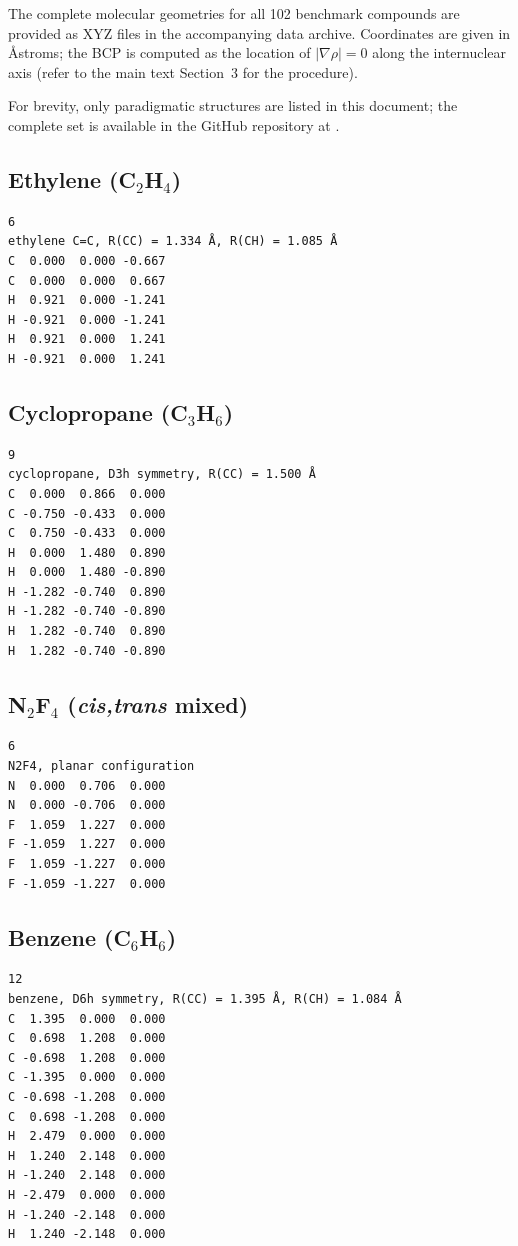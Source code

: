 \documentclass[11pt,a4paper]{article}
\begin{document}
The complete molecular geometries for all 102 benchmark compounds are provided
as XYZ files in the accompanying data archive. Coordinates are given in
\AA{}stroms; the BCP is computed as the location of $|\nabla \rho| = 0$ along
the internuclear axis (refer to the main text Section~3 for the procedure).

For brevity, only paradigmatic structures are listed in this document;
the complete set is available in the GitHub repository at
.

\subsection*{Ethylene (C$_2$H$_4$)}
\begin{verbatim}
6
ethylene C=C, R(CC) = 1.334 Å, R(CH) = 1.085 Å
C  0.000  0.000 -0.667
C  0.000  0.000  0.667
H  0.921  0.000 -1.241
H -0.921  0.000 -1.241
H  0.921  0.000  1.241
H -0.921  0.000  1.241
\end{verbatim}

\subsection*{Cyclopropane (C$_3$H$_6$)}
\begin{verbatim}
9
cyclopropane, D3h symmetry, R(CC) = 1.500 Å
C  0.000  0.866  0.000
C -0.750 -0.433  0.000
C  0.750 -0.433  0.000
H  0.000  1.480  0.890
H  0.000  1.480 -0.890
H -1.282 -0.740  0.890
H -1.282 -0.740 -0.890
H  1.282 -0.740  0.890
H  1.282 -0.740 -0.890
\end{verbatim}

\subsection*{N$_2$F$_4$ (\textit{cis,trans} mixed)}
\begin{verbatim}
6
N2F4, planar configuration
N  0.000  0.706  0.000
N  0.000 -0.706  0.000
F  1.059  1.227  0.000
F -1.059  1.227  0.000
F  1.059 -1.227  0.000
F -1.059 -1.227  0.000
\end{verbatim}

\subsection*{Benzene (C$_6$H$_6$)}
\begin{verbatim}
12
benzene, D6h symmetry, R(CC) = 1.395 Å, R(CH) = 1.084 Å
C  1.395  0.000  0.000
C  0.698  1.208  0.000
C -0.698  1.208  0.000
C -1.395  0.000  0.000
C -0.698 -1.208  0.000
C  0.698 -1.208  0.000
H  2.479  0.000  0.000
H  1.240  2.148  0.000
H -1.240  2.148  0.000
H -2.479  0.000  0.000
H -1.240 -2.148  0.000
H  1.240 -2.148  0.000
\end{verbatim}
\end{document}
